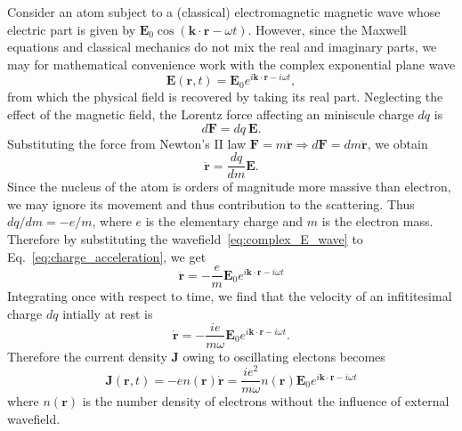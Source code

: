 Consider an atom subject to a (classical) electromagnetic magnetic wave whose electric part is given by $\mathbf{E}_0 \cos (\mathbf{k}\cdot\mathbf{r}- \omega t)$. However, since the Maxwell equations and classical mechanics do not mix the real and imaginary parts, we may for mathematical convenience work with the complex exponential plane wave 
\begin{equation}\label{eq:complex_E_wave}
\mathbf{E}(\mathbf{r},t) = \mathbf{E}_0 e^{i \mathbf{k}\cdot\mathbf{r}-i \omega t},
\end{equation}
from which the physical field is recovered by taking its real part. Neglecting the effect of the magnetic field, the Lorentz force affecting an miniscule charge $dq$ is
\begin{equation}
d\mathbf{F} = dq \ \mathbf{E}.
\end{equation}
Substituting the force from Newton's II law $\mathbf{F} = m \ddot{\mathbf{r}} \Rightarrow d\mathbf{F} = dm \ddot{\mathbf{r}}$, we obtain
\begin{equation}\label{eq:charge_acceleration}
\ddot{\mathbf{r}} = \frac{dq}{dm} \mathbf{E}.
\end{equation}
Since the nucleus of the atom is orders of magnitude more massive than electron, we may ignore its movement and thus contribution to the scattering. Thus $dq/dm = -e/m$, where $e$ is the elementary charge and $m$ is the electron mass. Therefore by substituting the wavefield~\eqref{eq:complex_E_wave} to Eq.~\eqref{eq:charge_acceleration}, we get
\begin{equation}
\ddot{\mathbf{r}} = -\frac{e}{m} \mathbf{E}_0 e^{i \mathbf{k}\cdot\mathbf{r}-i \omega t}
\end{equation}
Integrating once with respect to time, we find that the velocity of an infititesimal charge $dq$ intially at rest is
\begin{equation}
\dot{\mathbf{r}} = -\frac{ie}{m\omega} \mathbf{E}_0 e^{i \mathbf{k}\cdot\mathbf{r}-i \omega t}.
\end{equation}
Therefore the current density $\mathbf{J}$ owing to oscillating electons becomes
\begin{equation}\label{eq:oscillating_J}
\mathbf{J}(\mathbf{r},t) = -en(\mathbf{r})\dot{\mathbf{r}} =
\frac{ie^2}{m\omega} n(\mathbf{r}) \mathbf{E}_0 e^{i \mathbf{k}\cdot\mathbf{r}-i \omega t}
\end{equation}
where $n(\mathbf{r})$ is the number density of electrons without the influence of external wavefield.

